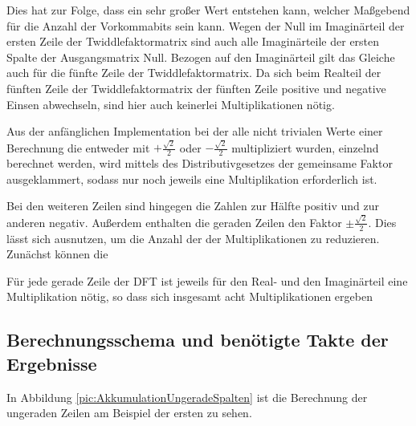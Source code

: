Dies hat zur Folge, dass ein sehr großer Wert entstehen kann, welcher Maßgebend für die Anzahl der Vorkommabits sein kann.
%
Wegen der Null im Imaginärteil der ersten Zeile der Twiddlefaktormatrix sind auch alle Imaginärteile der ersten Spalte der Ausgangsmatrix Null.
Bezogen auf den Imaginärteil gilt das Gleiche auch für die fünfte Zeile der Twiddlefaktormatrix. 
%
Da sich beim Realteil der fünften Zeile der Twiddlefaktormatrix der fünften Zeile positive und negative Einsen abwechseln, sind hier auch keinerlei Multiplikationen nötig.

Aus der anfänglichen Implementation bei der alle nicht trivialen Werte einer Berechnung die entweder mit $+\frac{\sqrt{2}}{2}$ oder $-\frac{\sqrt{2}}{2}$ multipliziert wurden,
einzelnd berechnet werden, wird mittels des Distributivgesetzes der gemeinsame Faktor ausgeklammert, sodass nur noch jeweils eine Multiplikation erforderlich ist.


Bei den weiteren Zeilen sind hingegen die Zahlen zur Hälfte positiv und zur anderen negativ. Außerdem enthalten die geraden Zeilen den Faktor $\pm\frac{\sqrt{2}}{2}$. 
Dies lässt sich ausnutzen, um die Anzahl der der Multiplikationen zu reduzieren. Zunächst können die 

Für jede gerade Zeile der DFT ist jeweils für den Real- und den Imaginärteil eine Multiplikation nötig, so dass sich insgesamt acht Multiplikationen ergeben
 



 
 
\subsection{Berechnungsschema und benötigte Takte der Ergebnisse}\label{sec:Berechnungsschema}

In Abbildung \ref{pic:AkkumulationUngeradeSpalten} ist die Berechnung der ungeraden Zeilen am Beispiel der ersten zu sehen.


